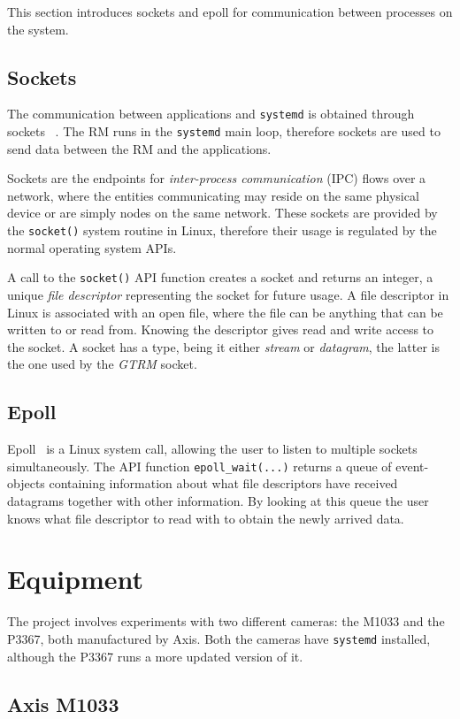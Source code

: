 \documentclass[nobiblatex]{LTHthesis}
\begin{document}
This section introduces sockets and epoll for communication between 
processes on the system.

\subsection{Sockets}
The communication between applications and \texttt{systemd} is obtained
through sockets ~\cite{socket}. The RM runs in the \texttt{systemd} main 
loop, therefore sockets are used to send data between the RM and 
the applications.

Sockets are the endpoints for \emph{inter-process communication} (IPC) 
flows over a network, where the entities communicating may reside on the
same physical device or are simply nodes on the same network. These sockets
are provided by the \texttt{socket()} system routine in Linux, therefore
their usage is regulated by the normal operating system APIs.

A call to the \texttt{socket()} API function creates a socket and returns 
an integer, a unique \emph{file descriptor} representing the socket for
future usage. A file descriptor in Linux is associated with an open file,
where the file can be anything that can be written to or read from. 
Knowing the descriptor gives read and write access to the socket. 
A socket has a type, being it either \emph{stream} or \emph{datagram}, 
the latter is the one used by the \emph{GTRM} socket.


\subsection{Epoll}
Epoll~\cite{epoll} is a Linux system call, allowing the user to listen to
multiple sockets simultaneously. The API function 
\texttt{epoll\_wait(...)} returns a queue of event-objects containing 
information about what file descriptors have received datagrams together 
with other information. By looking at this queue the user knows what 
file descriptor to read with to obtain the newly arrived data.  

\section{Equipment}
The project involves experiments with two different cameras: the M1033 and 
the P3367, both manufactured by Axis. Both the cameras have \texttt{systemd}
installed, although the P3367 runs a more updated version of it. 

\subsection{Axis M1033}
\end{document}
